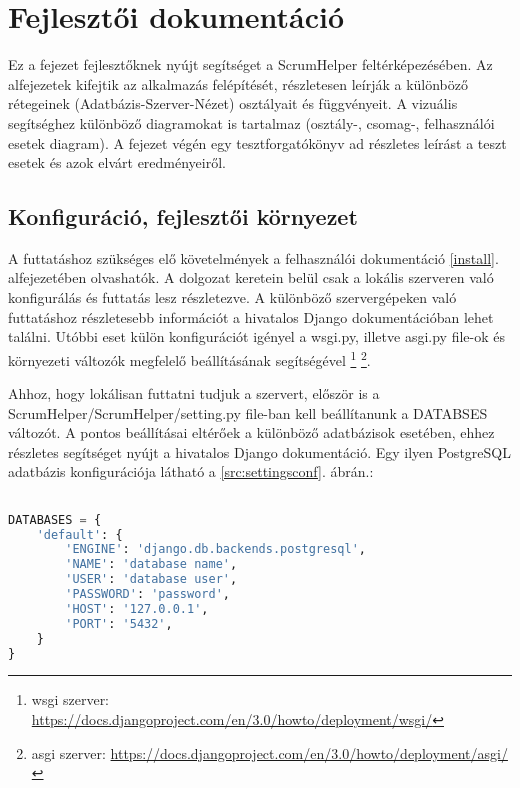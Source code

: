 \chapter{Fejlesztői dokumentáció} %
\label{ch:impl}

Ez a fejezet fejlesztőknek nyújt segítséget a ScrumHelper feltérképezésében. Az alfejezetek kifejtik az alkalmazás felépítését, részletesen leírják a különböző rétegeinek (Adatbázis-Szerver-Nézet) osztályait és függvényeit. A vizuális segítséghez különböző diagramokat is tartalmaz (osztály-, csomag-, felhasználói esetek diagram). A fejezet végén egy tesztforgatókönyv ad részletes leírást a teszt esetek és azok elvárt eredményeiről.

\section{Konfiguráció, fejlesztői környezet}
\label{config}

A futtatáshoz szükséges elő követelmények a felhasználói dokumentáció \ref{install}. alfejezetében olvashatók. A dolgozat keretein belül csak a lokális szerveren való konfigurálás és futtatás lesz részletezve. A különböző szervergépeken való futtatáshoz részletesebb információt a hivatalos Django dokumentációban lehet találni. Utóbbi eset külön konfigurációt igényel a wsgi.py, illetve asgi.py file-ok és környezeti változók megfelelő beállításának segítségével \footnote{wsgi szerver: \url{https://docs.djangoproject.com/en/3.0/howto/deployment/wsgi/}} \footnote{asgi szerver: \url{https://docs.djangoproject.com/en/3.0/howto/deployment/asgi/}}.  

Ahhoz, hogy lokálisan futtatni tudjuk a szervert, először is a ScrumHelper/ScrumHelper/setting.py file-ban kell beállítanunk a DATABSES változót. A pontos beállításai eltérőek a különböző adatbázisok esetében, ehhez részletes segítséget nyújt a hivatalos Django dokumentáció. Egy ilyen PostgreSQL adatbázis konfigurációja látható a \ref{src:settingsconf}. ábrán.:

\begin{lstlisting}[language={python}]

DATABASES = {
    'default': {
        'ENGINE': 'django.db.backends.postgresql',
        'NAME': 'database name',
        'USER': 'database user',
        'PASSWORD': 'password',
        'HOST': '127.0.0.1',
        'PORT': '5432',
    }
}

\end{lstlisting}

